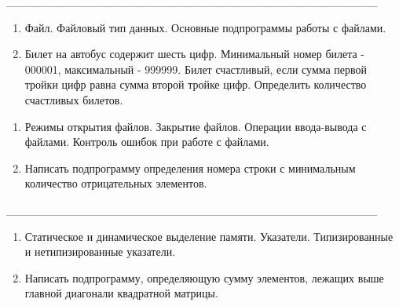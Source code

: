 \documentclass[oneside, final, 14pt]{extreport}
\newcommand{\cutline}{\_\_\_\_\_\_\_\_\_\_\_\_\_\_\_\_\_\_\_\_\_\_\_\_\_\_\_\_\_\_\_\_\_\_\_\_\_\_\_\_\_\_\_\_\_}
\begin{document}
\cutline


\begin{enumerate}
\item Файл. Файловый тип данных. Основные подпрограммы работы с файлами.
\item Билет на автобус содержит шесть цифр. Минимальный номер билета - 000001, максимальный - 999999. Билет счастливый, если сумма первой тройки цифр равна сумма второй тройке цифр.
Определить количество счастливых билетов.
\end{enumerate}


\newpage


\begin{enumerate}
\item Режимы открытия файлов. Закрытие файлов. Операции ввода-вывода с файлами.
Контроль ошибок при работе с файлами.
\item Написать подпрограмму определения номера строки с минимальным количество отрицательных элементов.
\end{enumerate}


\cutline


\begin{enumerate}
\item Статическое и динамическое выделение памяти. Указатели. Типизированные и нетипизированные указатели.
\item Написать подпрограмму, определяющую сумму элементов, лежащих выше главной диагонали 
квадратной матрицы.
\end{enumerate}

\end{document}
